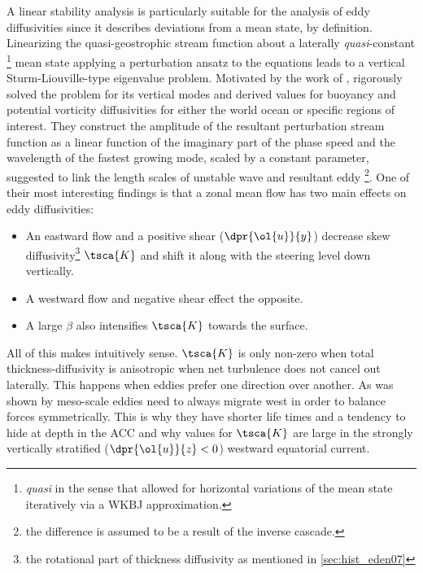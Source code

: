 \section*{\citealt{Eden2011a,eden2012implementing,Vollmer2013a}}\label{sec:hist_eden-linstab}
A linear stability analysis is particularly suitable for the analysis of eddy
diffusivities since it describes deviations from a mean state, by definition.
Linearizing the quasi-geostrophic stream function about a laterally
\textit{quasi}-constant \footnote{\textit{quasi} in the sense that \eg
\citeauthor*{Vollmer2013a} allowed for horizontal variations of the mean state
iteratively via a WKBJ approximation.} mean state \ie applying a perturbation
ansatz to the equations leads to a vertical Sturm-Liouville-type eigenvalue
problem. Motivated by the work of \cite{Smith2007},
\citeauthor{Eden2011a,eden2012implementing,Vollmer2013a} rigorously solved the
problem for its vertical modes and derived values for buoyancy and potential
vorticity diffusivities for either the world ocean or specific regions of
interest.  They construct the amplitude of the resultant perturbation stream
function as a linear function of the imaginary part of the phase speed and the
wavelength of the fastest growing mode, scaled by a
constant parameter, suggested to link the length scales of unstable wave and resultant eddy \footnote{the difference is assumed to be a result of the inverse cascade.}. One of their most interesting findings is that a zonal mean flow has two main effects on eddy diffusivities:
\begin{itemize}
	\item
	An eastward flow and a positive shear ($\dpr{\ol{u}}{y}$) decrease skew diffusivity\footnote{\ie the rotational part of thickness diffusivity as mentioned in \ref{sec:hist_eden07}} $\tsca{K}$  and shift it along with the steering level down vertically.
	\item
	A westward flow and negative shear effect the opposite.
	\item
	A large $\beta$ also intensifies $\tsca{K}$ towards the surface.
\end{itemize}
All of this makes intuitively sense. $\tsca{K}$ is only non-zero when total
thickness-diffusivity is anisotropic \ie when net turbulence does not cancel out
laterally. This happens when eddies prefer one direction over another. As was
shown by \cite{Cushman-Roisin1990} meso-scale eddies need to always migrate west
in order to balance forces symmetrically. This is why they have shorter life
times and a tendency to hide at depth in the ACC and why values for $\tsca{K}$
are large in the strongly vertically stratified ($\dpr{\ol{u}}{z}<0$) westward
equatorial current.
